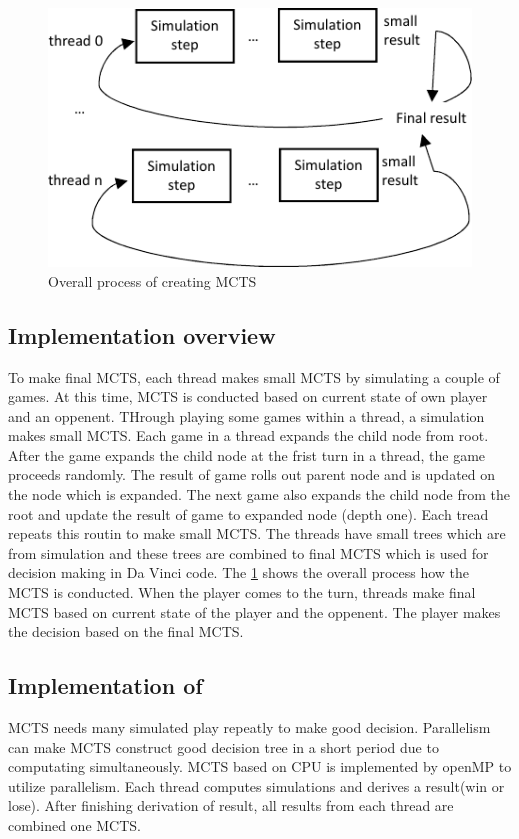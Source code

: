 \begin{figure}
\includegraphics[width=0.95\columnwidth]{figures/implementation.pdf}
\caption{Overall process of creating MCTS}
\label{fig:implementation}
\end{figure}

\subsection{Implementation overview}
To make final MCTS, each thread makes small MCTS by simulating a couple of games.
At this time, MCTS is conducted based on current state of own player and an oppenent.
THrough playing some games within a thread, a simulation makes small MCTS.
Each game in a thread expands the child node from root. 
After the game expands the child node at the frist turn in a thread, the game proceeds randomly. 
The result of game rolls out parent node and is updated on the node which is expanded. 
The next game also expands the child node from the root and update the result of game to expanded node (depth one).
Each tread repeats this routin to make small MCTS. 
The threads have small trees which are from simulation and these trees are combined to final MCTS which is used for decision making in Da Vinci code. 
The \cref{fig:implementation} shows the overall process how the MCTS is conducted.
When the player comes to the turn, threads make final MCTS based on current state of the player and the oppenent. 
The player makes the decision based on the final MCTS. 

\subsection{Implementation of \cpu}
MCTS needs many simulated play repeatly to make good decision. 
Parallelism can make MCTS construct good decision tree in a short period due to computating simultaneously. 
MCTS based on CPU is implemented by openMP to utilize parallelism. 
Each thread computes simulations and derives a result(win or lose). 
After finishing derivation of result, all results from each thread are combined one MCTS.

